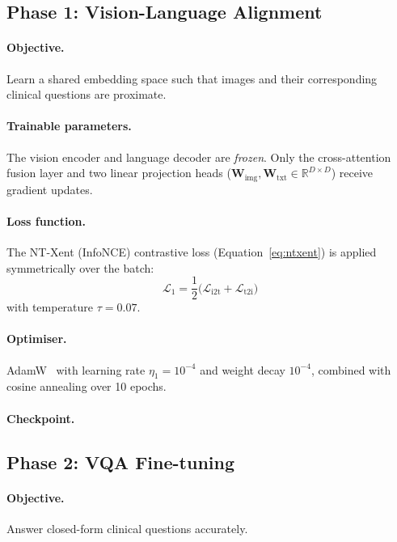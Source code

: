 \subsection{Phase 1: Vision-Language Alignment}
\label{subsec:phase1}

\paragraph{Objective.}
Learn a shared embedding space such that images and their corresponding
clinical questions are proximate.

\paragraph{Trainable parameters.}
The vision encoder and language decoder are \emph{frozen}. Only the
cross-attention fusion layer and two linear projection heads
($\mathbf{W}_{\mathrm{img}}, \mathbf{W}_{\mathrm{txt}} \in
\mathbb{R}^{D \times D}$) receive gradient updates.

\paragraph{Loss function.}
The NT-Xent (InfoNCE) contrastive loss (Equation~\ref{eq:ntxent}) is applied
symmetrically over the batch:
\begin{equation}
  \mathcal{L}_1 = \frac{1}{2}\bigl(
    \mathcal{L}_{\mathrm{i2t}} + \mathcal{L}_{\mathrm{t2i}}
  \bigr)
  \label{eq:phase1_loss}
\end{equation}
with temperature $\tau = 0.07$.

\paragraph{Optimiser.}
AdamW~\citep{loshchilov2019adamw} with learning rate $\eta_1 = 10^{-4}$
and weight decay $10^{-4}$, combined with cosine annealing over 10 epochs.

\paragraph{Checkpoint.}

\subsection{Phase 2: VQA Fine-tuning}
\label{subsec:phase2}

\paragraph{Objective.}
Answer closed-form clinical questions accurately.

